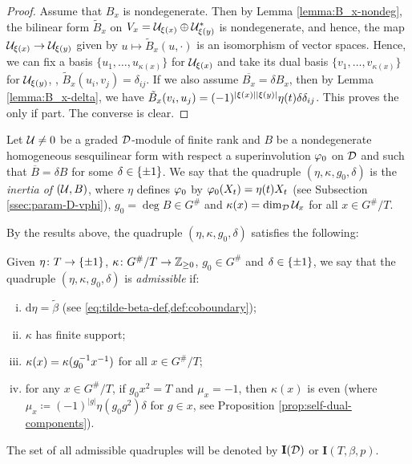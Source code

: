 \begin{proof}
	Assume that $B_x$ is nondegenerate.
	Then by Lemma \ref{lemma:B_x-nondeg}, the bilinear form $\tilde B_x$ on $V_x = \mathcal U_{\xi(x)} \oplus \mathcal U_{\xi(y)}^*$ is nondegenerate, and hence, the map $\mathcal U_{\xi(x)} \to \mathcal U_{\xi(y)}$ given by $u \mapsto \tilde B_x (u, \cdot)$  is an isomorphism of vector spaces.
	Hence, we can fix a basis $\{u_1, \ldots, u_{\kappa(x)} \}$ for $\mathcal U_{\xi(x)}$ and take its dual basis $\{v_1, \ldots, v_{\kappa(x)} \}$ for $\mathcal U_{\xi(y)}$, \ie, $\tilde B_x (u_i, v_j) = \delta_{ij}$.
	If we also assume $\overline{B_x} = \delta B_x$, then by Lemma \ref{lemma:B_x-delta}, we have $\tilde B_x (v_i, u_j) = (-1)^{|\xi(x)||\xi(y)|} \eta(t) \delta \delta_{ij}$.
	This proves the only if part.
	The converse is clear.
\end{proof}

\begin{defi}\label{def:parameter-of-(U,B)}
	Let $\mathcal U\neq 0$ be a graded $\mathcal{D}$-module of finite rank and $B$ be a nondegenerate homogeneous sesquilinear form with respect a superinvolution $\varphi_0$ on $\mathcal{D}$ and such that $\overline{B} = \delta B$ for some $\delta \in \{ \pm 1 \}$.
	We say that the quadruple $(\eta, \kappa, g_0, \delta)$ is the \emph{inertia of $(\mathcal U, B)$}, where $\eta$ defines $\varphi_0$ by $\varphi_0(X_t) = \eta(t)X_t$ (see Subsection \ref{ssec:param-D-vphi}), $g_0 = \deg B \in G^\#$ and $\kappa(x) = \dim_{\mathcal{D}} \mathcal U_x$ for all $x \in G^\#/T$.
\end{defi}

By the results above, the quadruple $(\eta, \kappa, g_0, \delta)$ satisfies the following:

\begin{defi}\label{defi:X(D)}
	Given $\eta\colon T \to \{ \pm 1 \}$,
	$\kappa\colon G^\#/T \to \mathbb{Z}_{\geq 0}$, $g_0 \in G^\#$ and $\delta \in \{ \pm 1 \}$, we say that the quadruple $(\eta, \kappa, g_0, \delta)$ is \emph{admissible} if:
	\begin{enumerate}[(i)]
		\item $\mathrm{d}\eta = \tilde\beta$ (see  \cref{eq:tilde-beta-def,def:coboundary}); \label{item:eta-is-eta}
		\item $\kappa$ has finite support; \label{item:kappa-finite-support}
		\item $\kappa(x) = \kappa(g_0^{-1} x^{-1})$ for all $x \in G^\#/T$; \label{item:kappa-duality}
		\item for any $x\in G^\#/T$, if $g_0 x^2 = T$ and $\mu_x = -1$, then $\kappa (x)$ is even (where \\$\mu_x\coloneqq (-1)^{|g|}\eta(g_0 g^2)\delta$ for $g\in x$, see Proposition \ref{prop:self-dual-components}). \label{item:kappa-parity}
	\end{enumerate}
	The set of all admissible quadruples will be denoted by $\mathbf{I}(\mathcal{D})$ or $\mathbf{I}(T, \beta, p)$.
\end{defi}

